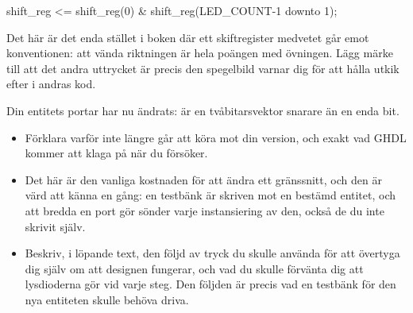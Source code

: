 \begin{vhdlcode}
shift_reg <= shift_reg(0) & shift_reg(LED_COUNT-1 downto 1);
\end{vhdlcode}

Det här är det enda stället i boken där ett skiftregister medvetet går emot konventionen: att vända
riktningen är hela poängen med övningen. Lägg märke till att det andra uttrycket är precis den
spegelbild  varnar dig för att hålla utkik efter i andras kod.

 Din entitets portar har nu ändrats:  är en tvåbitarsvektor snarare än en
enda bit.
\begin{itemize}
  \item Förklara varför  inte längre går att köra mot din version, och
    exakt vad GHDL kommer att klaga på när du försöker.
  \item Det här är den vanliga kostnaden för att ändra ett gränssnitt, och den är värd att känna en
    gång: en testbänk är skriven mot en bestämd entitet, och att bredda en port gör sönder varje
    instansiering av den, också de du inte skrivit själv.
  \item Beskriv, i löpande text, den följd av tryck du skulle använda för att övertyga dig själv om
    att designen fungerar, och vad du skulle förvänta dig att lysdioderna gör vid varje steg. Den
    följden är precis vad en testbänk för den nya entiteten skulle behöva driva.
\end{itemize}
